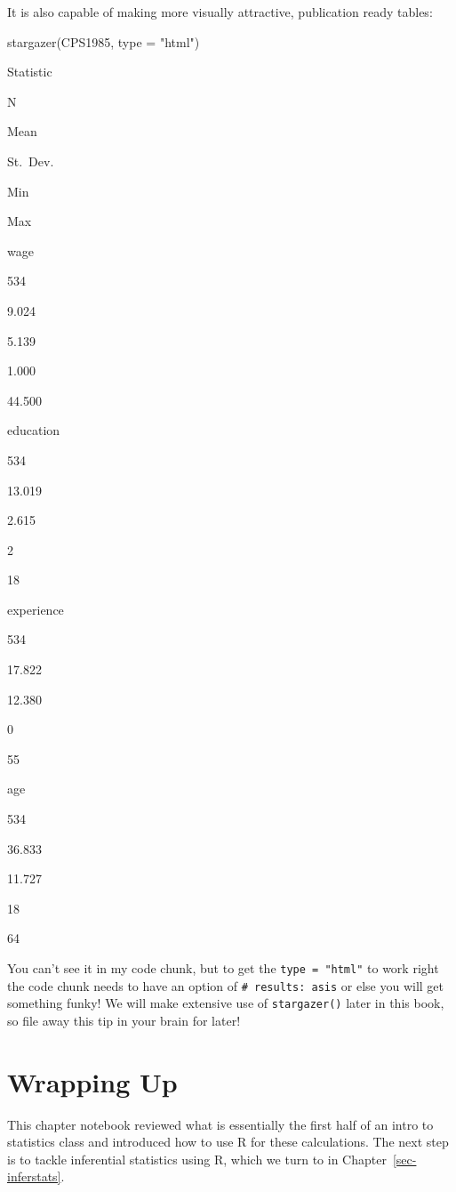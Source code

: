 \documentclass[
  letterpaper,
]{book}
\newenvironment{Shaded}{\begin{snugshade}}{\end{snugshade}}
\newcommand{\AttributeTok}[1]{\textcolor[rgb]{0.40,0.45,0.13}{#1}}
\newcommand{\FunctionTok}[1]{\textcolor[rgb]{0.28,0.35,0.67}{#1}}
\newcommand{\NormalTok}[1]{\textcolor[rgb]{0.00,0.23,0.31}{#1}}
\newcommand{\StringTok}[1]{\textcolor[rgb]{0.13,0.47,0.30}{#1}}
\begin{document}
It is also capable of making more visually attractive, publication ready
tables:

\begin{Shaded}
\begin{Highlighting}[]
\FunctionTok{stargazer}\NormalTok{(CPS1985, }\AttributeTok{type =} \StringTok{"html"}\NormalTok{)}
\end{Highlighting}
\end{Shaded}

Statistic

N

Mean

St.~Dev.

Min

Max

wage

534

9.024

5.139

1.000

44.500

education

534

13.019

2.615

2

18

experience

534

17.822

12.380

0

55

age

534

36.833

11.727

18

64

You can't see it in my code chunk, but to get the
\texttt{type\ =\ "html"} to work right the code chunk needs to have an
option of \texttt{\#\textbar{}\ results:\ asis} or else you will get
something funky! We will make extensive use of \texttt{stargazer()}
later in this book, so file away this tip in your brain for later!

\section{Wrapping Up}\label{wrapping-up-2}

This chapter notebook reviewed what is essentially the first half of an
intro to statistics class and introduced how to use R for these
calculations. The next step is to tackle inferential statistics using R,
which we turn to in Chapter~\ref{sec-inferstats}.
\end{document}
